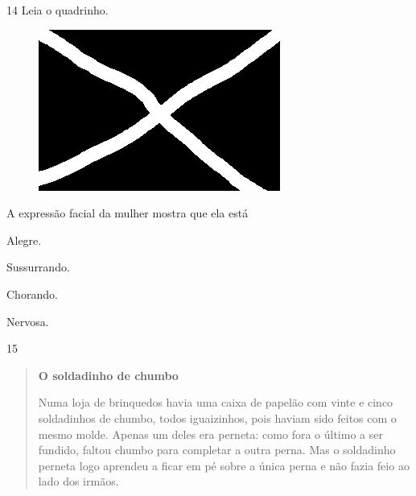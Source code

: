 \num{14} Leia o quadrinho.

\begin{figure}[htpb!]
\centering
\includegraphics[width=\textwidth]{media/confederados.png}
\end{figure}

A expressão facial da mulher mostra que ela está

\begin{escolha}
\item Alegre.

\item Sussurrando.

\item Chorando.

\item Nervosa.
\end{escolha}

\pagebreak
\num{15}

\begin{quote}
\textbf{O soldadinho de chumbo}

Numa loja de brinquedos havia uma caixa de papelão com
vinte e cinco soldadinhos de chumbo, todos iguaizinhos, pois
haviam sido feitos com o mesmo molde. Apenas um deles
era perneta: como fora o último a ser fundido, faltou chumbo
para completar a outra perna. Mas o soldadinho perneta logo
aprendeu a ficar em pé sobre a única perna e não fazia feio ao
lado dos irmãos.

\end{quote}

